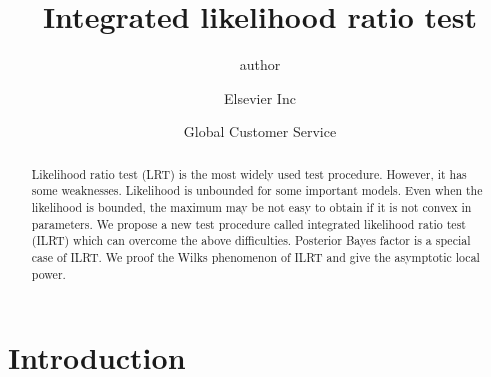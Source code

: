 \documentclass[review]{elsarticle}
\begin{document}
\begin{frontmatter}

\title{Integrated likelihood ratio test}

\author{author }
\address{Radarweg 29, Amsterdam}

\author[mymainaddress,mysecondaryaddress]{Elsevier Inc}

\author[mysecondaryaddress]{Global Customer Service}

\address[mymainaddress]{1600 John F Kennedy Boulevard, Philadelphia}
\address[mysecondaryaddress]{360 Park Avenue South, New York}

\begin{abstract}

    Likelihood ratio test (LRT) is the most widely used test procedure. However, it has some weaknesses. Likelihood is unbounded for some important models. Even when the likelihood is bounded, the maximum may be not easy to obtain if it is not convex in parameters. We propose a new test procedure called integrated likelihood ratio test (ILRT) which can overcome the above difficulties. Posterior Bayes factor is a special case of ILRT\@. We proof the Wilks phenomenon of ILRT and give the asymptotic
    local power.
\end{abstract}

\begin{keyword}
\end{keyword}

\end{frontmatter}


\section{Introduction}
\end{document}
